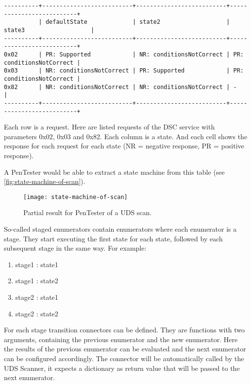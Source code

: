 \begin{samepage}
\begin{verbatim}
----------+--------------------------+--------------------------+--------------------------+
          | defaultState             | state2                   | state3                   | 
----------+--------------------------+--------------------------+--------------------------+
0x02      | PR: Supported            | NR: conditionsNotCorrect | PR: conditionsNotCorrect | 
0x03      | NR: conditionsNotCorrect | PR: Supported            | PR: conditionsNotCorrect | 
0x82      | NR: conditionsNotCorrect | NR: conditionsNotCorrect | -                        | 
----------+--------------------------+--------------------------+--------------------------+
\end{verbatim}
\end{samepage}

Each row is a request. Here are listed requests of the DSC service with parameters 0x02, 0x03 and 0x82. Each column is a state. And each cell shows the response for each request for each state (NR = negative response, PR = positive response).

A PenTester would be able to extract a state machine from this table (see \autoref{fig:state-machine-of-scan}).

\begin{figure}[h]
    \centering
    \texttt{[image: state-machine-of-scan]}
    \caption{Partial result for PenTester of a UDS scan.}
    \label{fig:state-machine-of-scan}
\end{figure}

So-called staged enumerators contain enumerators where each enumerator is a stage. They start executing the first state for each state, followed by each subsequent stage in the same way. For example:
\begin{enumerate}
    \item stage1 : state1
    \item stage1 : state2
    \item stage2 : state1
    \item stage2 : state2
\end{enumerate}

For each stage transition connectors can be defined. They are functions with two arguments, containing the previous enumerator and the new enumerator. Here the results of the previous enumerator can be evaluated and the next enumerator can be configured accordingly. The connector will be automatically called by the UDS Scanner, it expects a dictionary as return value that will be passed to the next enumerator. 

